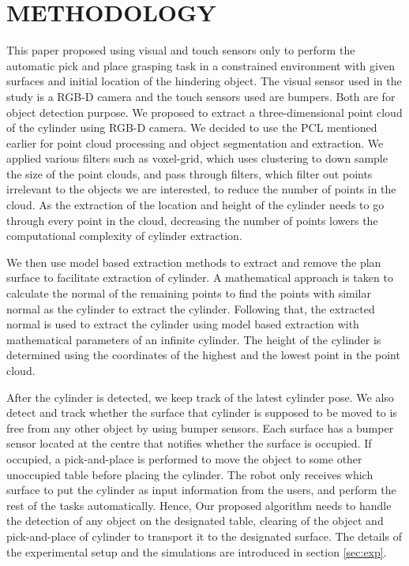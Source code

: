 \section{METHODOLOGY}\label{Sec:proposal===}
This paper proposed using visual and touch sensors only to perform the automatic pick and place grasping task in a constrained environment with given surfaces and initial location of the hindering object. The visual sensor used in the study is a RGB-D camera and the touch sensors used are bumpers. Both are for object detection purpose. We proposed to extract a three-dimensional point cloud of the cylinder using RGB-D camera. We decided to use the PCL mentioned earlier for point cloud processing and object segmentation and extraction. We applied various filters such as voxel-grid, which uses clustering to down sample the size of the point clouds, and pass through filters, which filter out points irrelevant to the objects we are interested, to reduce the number of points in the cloud. As the  extraction of the location and height of the cylinder needs to go through every point in the cloud, decreasing the number of points lowers the computational complexity of cylinder extraction. 

We then use model based extraction methods to extract and remove the plan surface to facilitate extraction of cylinder. A mathematical approach is taken to calculate the normal of the remaining points to find the points with similar normal as the cylinder to extract the cylinder. Following that, the extracted normal is used to extract the cylinder using model based extraction with mathematical parameters of an infinite cylinder. The height of the cylinder is determined using the coordinates of the highest and the lowest point in the point cloud. 

After the cylinder is detected, we keep track of the latest cylinder pose. We also detect and track whether the surface that cylinder is supposed to be moved to is free from any other object by using bumper sensors. Each surface has a bumper sensor located at the centre that notifies whether the surface is occupied. If occupied, a pick-and-place is performed to move the object to some other unoccupied table before placing the cylinder. The robot only receives which surface to put the cylinder as input information from the users, and perform the rest of the tasks automatically. Hence, Our proposed algorithm needs to handle the detection of any object on the designated table, clearing of the object and pick-and-place of cylinder to transport it to the designated surface. The details of the experimental setup and the simulations are introduced in section \ref{sec:exp}. 